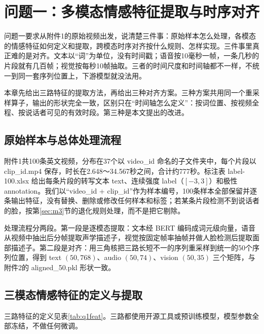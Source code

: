 \section{问题一：多模态情感特征提取与时序对齐}\label{sec:q1}

问题一要求从附件1的原始视频出发，说清楚三件事：原始样本怎么处理，各模态的情感特征如何定义和提取，跨模态时序对齐按什么规则、怎样实现。三件事里真正难的是对齐。文本以“词”为单位，没有时间戳；语音按10毫秒一帧，一条几秒的片段就有几百帧；视觉按每秒10帧抽取。三者的时间尺度和时间轴都不一样，不统一到同一套序列位置上，下游模型就没法用。

本章先给出三路特征的提取方法，再给出三种对齐方案。三种方案共用同一个重采样算子，输出的形状完全一致，区别只在“时间轴怎么定义”：按词位置、按视频全程、按说话者可见的有效时段。第三种是本文提出的改进。

\subsection{原始样本与总体处理流程}\label{sec:q1flow}

附件1共100条英文视频，分布在37个以 video\_id 命名的子文件夹中，每个片段以 clip\_id.mp4 保存，时长在2.648～34.567秒之间，合计约777秒。标注表 label-100.xlsx 给出每条片段的转写文本 text、连续强度 label（$[-3,3]$）和极性 annotation。我们以“video\_id + clip\_id”作为样本编号，100条样本全部保留并逐条输出特征，没有替换、删除或修改任何样本和标签；若某条片段检测不到说话者的脸，按第\ref{sec:m3}节的退化规则处理，而不是把它剔除。

处理流程分两段。第一段是逐模态提取：文本经 BERT 编码成词元级向量，语音从视频中抽出后分帧提取声学描述子，视觉按固定帧率抽帧并做人脸检测后提取面部描述子。第二段是对齐：用三角核把三路长短不一的序列重采样到统一的50个序列位置，得到 text $(50,768)$、audio $(50,74)$、vision $(50,35)$ 三个矩阵，与附件2的 aligned\_50.pkl 形状一致。

\subsection{三模态情感特征的定义与提取}\label{sec:q1feat}

三路特征的定义见表\ref{tab:q1feat}。三路都使用开源工具或预训练模型，模型参数全部冻结，不做任何微调。

